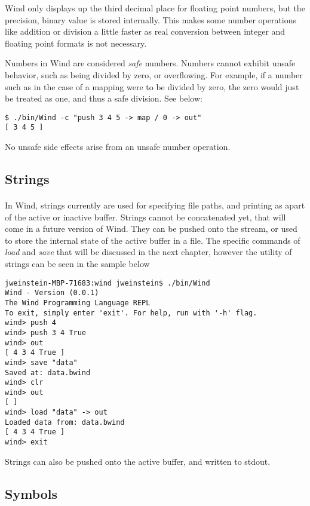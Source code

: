 \par Wind only displays up the third decimal place for floating point numbers, but the precision, binary value is stored internally. This makes some number operations like addition or division a little faster as real conversion between integer and floating point formats is not necessary.
\par Numbers in Wind are considered \emph{safe} numbers. Numbers cannot exhibit unsafe behavior, such as being divided by zero, or overflowing. For example, if a number such as in the case of a mapping were to be divided by zero, the zero would just be treated as one, and thus a safe division. See below:
\begin{verbatim}
$ ./bin/Wind -c "push 3 4 5 -> map / 0 -> out"
[ 3 4 5 ]
\end{verbatim}

No unsafe side effects arise from an unsafe number operation.

\subsection{Strings}

\paragraph{  } In Wind, strings currently are used for specifying file paths, and printing as apart of the active or inactive buffer. Strings cannot be concatenated yet, that will come in a future version of Wind. They can be pushed onto the stream, or used to store the internal state of the active buffer in a file. The specific commands of \emph{load} and \emph{save} that will be discussed in the next chapter, however the utility of strings can be seen in the sample below

\begin{verbatim}
jweinstein-MBP-71683:wind jweinstein$ ./bin/Wind
Wind - Version (0.0.1)
The Wind Programming Language REPL
To exit, simply enter 'exit'. For help, run with '-h' flag.
wind> push 4
wind> push 3 4 True 
wind> out
[ 4 3 4 True ]
wind> save "data"
Saved at: data.bwind
wind> clr
wind> out
[ ]
wind> load "data" -> out
Loaded data from: data.bwind
[ 4 3 4 True ]
wind> exit
\end{verbatim}

\par Strings can also be pushed onto the active buffer, and written to stdout.

\subsection{Symbols}

